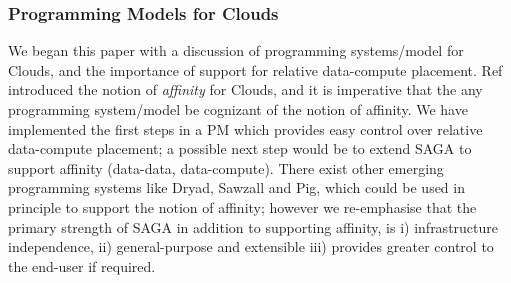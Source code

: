\documentclass[conference,final]{IEEEtran}
\newcommand{\jhanote}[1]{ {\textcolor{red} { ***SJ: #1 }}}
\newcommand{\jhanote}[1]{}
\begin{document}




\subsubsection*{Programming Models for Clouds} We began this paper
with a discussion of programming systems/model for Clouds, and the
importance of support for relative data-compute
placement. Ref~\cite{jha_ccpe09} introduced the notion of {\it
  affinity} for Clouds, and it is imperative that the any programming
system/model be cognizant of the notion of affinity. We have
implemented the first steps in a PM which provides easy control over
relative data-compute placement; a possible next step would be to
extend SAGA to support affinity (data-data, data-compute).  There
exist other emerging programming systems like Dryad, Sawzall and Pig,
which could be used in principle to support the notion of affinity;
however we re-emphasise that the primary strength of SAGA in addition
to supporting affinity, is i) infrastructure independence, ii)
general-purpose and extensible %
iii) provides greater control to the end-user if required.
\end{document}
